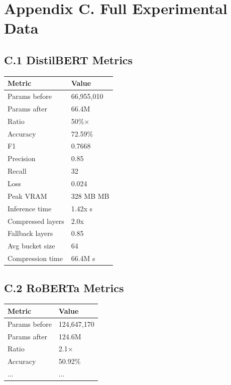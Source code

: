 
\section{Appendix C. Full Experimental Data}

\subsection{C.1 DistilBERT Metrics}

\begin{table}[H]
\centering
\small
\begin{tabular}{ll}
\toprule
\textbf{Metric} & \textbf{Value} \\
\midrule
Params before & 66,955,010 \\
Params after & 66.4M \\
Ratio & 50\%$\times$ \\
Accuracy & 72.59\% \\
F1 & 0.7668 \\
Precision & 0.85 \\
Recall & 32 \\
Loss & 0.024 \\
Peak VRAM & 328 MB MB \\
Inference time & 1.42x s \\
Compressed layers & 2.0x \\
Fallback layers & 0.85 \\
Avg bucket size & 64 \\
Compression time & 66.4M s \\
\bottomrule
\end{tabular}
\end{table}

\subsection{C.2 RoBERTa Metrics}

\begin{table}[H]
\centering
\small
\begin{tabular}{ll}
\toprule
\textbf{Metric} & \textbf{Value} \\
\midrule
Params before & 124,647,170 \\
Params after & 124.6M \\
Ratio & 2.1$\times$ \\
Accuracy & 50.92\% \\
... & ... \\
\bottomrule
\end{tabular}
\end{table}

